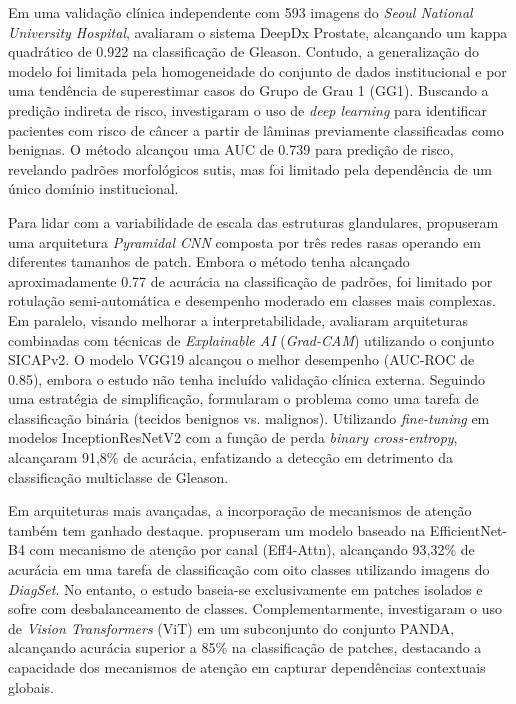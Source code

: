 Em uma validação clínica independente com 593 imagens do \textit{Seoul National University Hospital}, \cite{jung2022artificial} avaliaram o sistema DeepDx Prostate, alcançando um kappa quadrático de 0.922 na classificação de Gleason. Contudo, a generalização do modelo foi limitada pela homogeneidade do conjunto de dados institucional e por uma tendência de superestimar casos do Grupo de Grau 1 (GG1). Buscando a predição indireta de risco, \cite{liu2022deep} investigaram o uso de \textit{deep learning} para identificar pacientes com risco de câncer a partir de lâminas previamente classificadas como benignas. O método alcançou uma AUC de 0.739 para predição de risco, revelando padrões morfológicos sutis, mas foi limitado pela dependência de um único domínio institucional.

Para lidar com a variabilidade de escala das estruturas glandulares, \cite{pyramidalcnn} propuseram uma arquitetura \textit{Pyramidal CNN} composta por três redes rasas operando em diferentes tamanhos de patch. Embora o método tenha alcançado aproximadamente 0.77 de acurácia na classificação de padrões, foi limitado por rotulação semi-automática e desempenho moderado em classes mais complexas. Em paralelo, visando melhorar a interpretabilidade, \cite{kosoko2024xai_prostate} avaliaram arquiteturas combinadas com técnicas de \textit{Explainable AI} (\textit{Grad-CAM}) utilizando o conjunto SICAPv2. O modelo VGG19 alcançou o melhor desempenho (AUC-ROC de 0.85), embora o estudo não tenha incluído validação clínica externa. Seguindo uma estratégia de simplificação, \cite{afifi2024prostate} formularam o problema como uma tarefa de classificação binária (tecidos benignos vs. malignos). Utilizando \textit{fine-tuning} em modelos InceptionResNetV2 com a função de perda \textit{binary cross-entropy}, alcançaram 91,8\% de acurácia, enfatizando a detecção em detrimento da classificação multiclasse de Gleason.

Em arquiteturas mais avançadas, a incorporação de mecanismos de atenção também tem ganhado destaque. \cite{alici2024efficient} propuseram um modelo baseado na EfficientNet-B4 com mecanismo de atenção por canal (Eff4-Attn), alcançando 93,32\% de acurácia em uma tarefa de classificação com oito classes utilizando imagens do \textit{DiagSet}. No entanto, o estudo baseia-se exclusivamente em patches isolados e sofre com desbalanceamento de classes. Complementarmente, \cite{ikromjanov2021vit_prostate} investigaram o uso de \textit{Vision Transformers} (ViT) em um subconjunto do conjunto PANDA, alcançando acurácia superior a 85\% na classificação de patches, destacando a capacidade dos mecanismos de atenção em capturar dependências contextuais globais.


